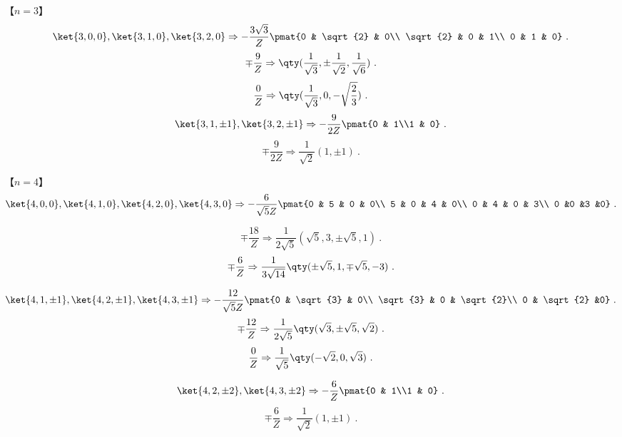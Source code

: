 【$n=3$】
\begin{equation}
\ket{3,0,0},\ket{3,1,0},\ket{3,2,0}\Rightarrow
-\frac{3\sqrt{3}}{Z}\pmat{0 & \sqrt{2} & 0\\ \sqrt{2} & 0 & 1\\ 0 & 1 & 0}~.
\end{equation}
\begin{equation}
\mp\frac{9}{Z} \Rightarrow \qty(\frac{1}{\sqrt{3}}, \pm \frac{1}{\sqrt{2}}, \frac{1}{\sqrt{6}})~.
\end{equation}
\begin{equation}
\frac{0}{Z} \Rightarrow \qty(\frac{1}{\sqrt{3}}, 0, -\sqrt{\frac{2}{3}})~.
\end{equation}
\begin{equation}
\ket{3,1,\pm1},\ket{3,2,\pm1} \Rightarrow
-\frac{9}{2Z}\pmat{0 & 1\\1 & 0}~.
\end{equation}
\begin{equation}
\mp\frac{9}{2Z} \Rightarrow \frac{1}{\sqrt 2}(1, \pm 1)~.
\end{equation}

【$n=4$】
\begin{equation}
\ket{4,0,0},\ket{4,1,0},\ket{4,2,0},\ket{4,3,0} \Rightarrow -\frac{6}{\sqrt{5}Z}\pmat{0 & 5 & 0 & 0\\ 5 & 0 & 4 & 0\\ 0 & 4 & 0 & 3\\ 0 &0 &3 &0}~.
\end{equation}

\begin{equation}
\mp\frac{18}{Z} \Rightarrow \frac{1}{2\sqrt{5}}(\sqrt{5},3,\pm\sqrt{5},1)~.
\end{equation}
\begin{equation}
\mp\frac{6}{Z} \Rightarrow \frac{1}{3\sqrt{14}}\qty(\pm\sqrt{5}, 1,\mp\sqrt{5},-3)~.
\end{equation}

\begin{equation}
\ket{4,1,\pm1},\ket{4,2,\pm1},\ket{4,3,\pm1} \Rightarrow -\frac{12}{\sqrt{5}Z}\pmat{0 & \sqrt{3} & 0\\ \sqrt{3} & 0 & \sqrt{2}\\ 0 & \sqrt{2} &0}~.
\end{equation}
\begin{equation}
\mp\frac{12}{Z} \Rightarrow \frac{1}{2\sqrt{5}}\qty(\sqrt{3},\pm\sqrt{5},\sqrt{2})~.
\end{equation}
\begin{equation}
\frac{0}{Z} \Rightarrow \frac{1}{\sqrt{5}}\qty(-\sqrt{2},0,\sqrt{3})~.
\end{equation}

\begin{equation}
\ket{4,2,\pm2},\ket{4,3,\pm2} \Rightarrow -\frac{6}{Z}\pmat{0 & 1\\1 & 0}~.
\end{equation}
\begin{equation}
\mp\frac{6}{Z} \Rightarrow \frac{1}{\sqrt{2}}(1,\pm 1)~.
\end{equation}
